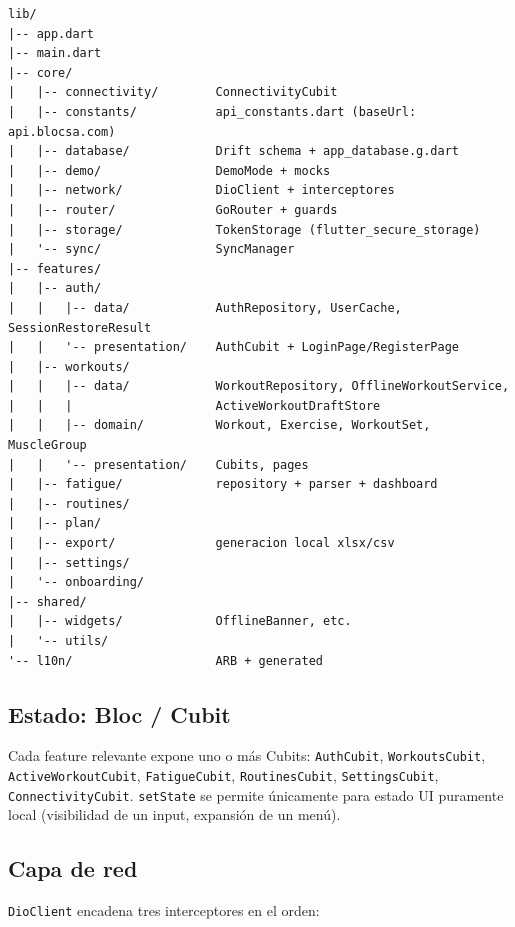 \documentclass[11pt,a4paper]{article}
\newcommand{\cls}[1]{\texttt{\small #1}}
\begin{document}
\begin{lstlisting}[caption={Estructura abreviada del módulo \texttt{lib/}.}]
lib/
|-- app.dart
|-- main.dart
|-- core/
|   |-- connectivity/        ConnectivityCubit
|   |-- constants/           api_constants.dart (baseUrl: api.blocsa.com)
|   |-- database/            Drift schema + app_database.g.dart
|   |-- demo/                DemoMode + mocks
|   |-- network/             DioClient + interceptores
|   |-- router/              GoRouter + guards
|   |-- storage/             TokenStorage (flutter_secure_storage)
|   '-- sync/                SyncManager
|-- features/
|   |-- auth/
|   |   |-- data/            AuthRepository, UserCache, SessionRestoreResult
|   |   '-- presentation/    AuthCubit + LoginPage/RegisterPage
|   |-- workouts/
|   |   |-- data/            WorkoutRepository, OfflineWorkoutService,
|   |   |                    ActiveWorkoutDraftStore
|   |   |-- domain/          Workout, Exercise, WorkoutSet, MuscleGroup
|   |   '-- presentation/    Cubits, pages
|   |-- fatigue/             repository + parser + dashboard
|   |-- routines/
|   |-- plan/
|   |-- export/              generacion local xlsx/csv
|   |-- settings/
|   '-- onboarding/
|-- shared/
|   |-- widgets/             OfflineBanner, etc.
|   '-- utils/
'-- l10n/                    ARB + generated
\end{lstlisting}

\subsection{Estado: Bloc / Cubit}

Cada feature relevante expone uno o más Cubits:
\cls{AuthCubit}, \cls{WorkoutsCubit}, \cls{ActiveWorkoutCubit}, \cls{FatigueCubit}, \cls{RoutinesCubit}, \cls{SettingsCubit}, \cls{ConnectivityCubit}. \texttt{setState} se permite únicamente para estado UI puramente local (visibilidad de un input, expansión de un menú).

\subsection{Capa de red}

\cls{DioClient} encadena tres interceptores en el orden:
\end{document}
